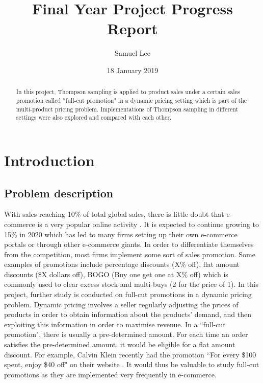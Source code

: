\documentclass[a4paper]{article}
\title{Final Year Project Progress Report}
\author{Samuel Lee}
\date{18 January 2019}
\begin{document}
\maketitle

\begin{abstract}
In this project, Thompson sampling is applied to product sales under a certain sales promotion called ``full-cut promotion" in a dynamic pricing setting which is part of the multi-product pricing problem. Implementations of Thompson sampling in different settings were also explored and compared with each other.


\end{abstract}

\section{Introduction}
\subsection{Problem description}
With sales reaching 10\% of total global sales, there is little doubt that e-commerce is a very popular online activity \cite{nano3}. It is expected to continue growing to 15\% in 2020 which has led to many firms setting up their own e-commerce portals or through other e-commerce giants. In order to differentiate themselves from the competition, most firms implement some sort of sales promotion. Some examples of promotions include percentage discounts (X\% off), flat amount discounts (\$X dollars off), BOGO (Buy one get one at X\% off) which is commonly used to clear excess stock and multi-buys (2 for the price of 1). In this project, further study is conducted on full-cut promotions in a dynamic pricing problem. Dynamic pricing involves a seller regularly adjusting the prices of products in order to obtain information about the products' demand, and then exploiting this information in order to maximise revenue. In a ``full-cut promotion", there is usually a pre-determined amount. For each time an order satisfies the pre-determined amount, it would be eligible for a flat amount discount. For example, Calvin Klein recently had the promotion ``For every \$100 spent, enjoy \$40 off" on their website \cite{CK}. It would thus be valuable to study full-cut promotions as they are implemented very frequently in e-commerce. 
\end{document}
